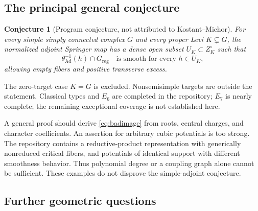 \documentclass[11pt]{article}
\newcommand{\reg}{\mathrm{reg}}
\newtheorem{conjecture}[theorem]{Conjecture}
\begin{document}
\subsection{The principal general conjecture}

\begin{conjecture}[Program conjecture, not attributed to Kostant--Michor]
For every simple simply connected complex $G$ and every proper Levi $K\subsetneq G$, the normalized adjoint Springer map has a dense open subset $U_K\subset Z_K^\circ$ such that
\[
 \theta_{\mathrm{Ad}}^{-1}(h)\cap G_{\reg}
 \quad\text{is smooth for every }h\in U_K,
\]
allowing empty fibers and positive transverse excess.
\end{conjecture}

The zero-target case $K=G$ is excluded. Nonsemisimple targets are outside the statement. Classical types and $E_6$ are completed in the repository; $E_7$ is nearly complete; the remaining exceptional coverage is not established here.

A general proof should derive \eqref{eq:badimage} from roots, central charges, and character coefficients. An assertion for arbitrary cubic potentials is too strong. The repository contains a reductive-product representation with generically nonreduced critical fibers, and potentials of identical support with different smoothness behavior. Thus polynomial degree or a coupling graph alone cannot be sufficient. These examples do not disprove the simple-adjoint conjecture.

\subsection{Further geometric questions}
\end{document}
